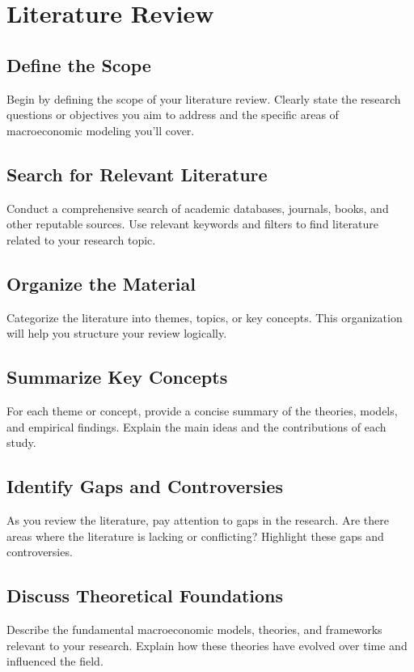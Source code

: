 \documentclass[../thesis.tex]{subfiles}
\begin{document}
	
	\newpage
	
	\section{Literature Review}\label{sec:literature-review}
	
	\begin{tcolorbox}[colback=red!5!white,colframe=red!75!black]
		
	\subsection{Define the Scope}
	Begin by defining the scope of your literature review. Clearly state the research questions or objectives you aim to address and the specific areas of macroeconomic modeling you'll cover.
	
	\subsection{Search for Relevant Literature}
	Conduct a comprehensive search of academic databases, journals, books, and other reputable sources. Use relevant keywords and filters to find literature related to your research topic.
	
	\subsection{Organize the Material}
	Categorize the literature into themes, topics, or key concepts. This organization will help you structure your review logically.
	
	\subsection{Summarize Key Concepts}
	For each theme or concept, provide a concise summary of the theories, models, and empirical findings. Explain the main ideas and the contributions of each study.
	
	\subsection{Identify Gaps and Controversies}
	As you review the literature, pay attention to gaps in the research. Are there areas where the literature is lacking or conflicting? Highlight these gaps and controversies.
	
	\subsection{Discuss Theoretical Foundations}
	Describe the fundamental macroeconomic models, theories, and frameworks relevant to your research. Explain how these theories have evolved over time and influenced the field.
	
	\end{tcolorbox}
	
\end{document}
